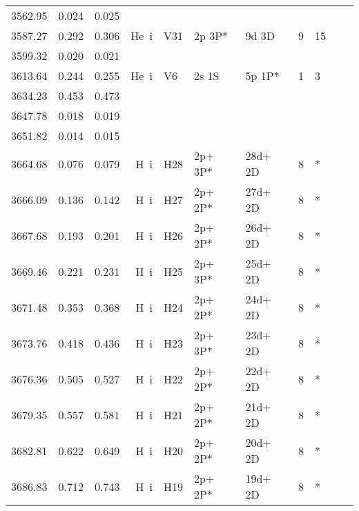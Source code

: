 \begin{longtable}{lrlrlllllll}
 3562.95 &   0.024 &   0.025                                                                                      \\
 3587.27 &   0.292 &   0.306 &  He~{\sc i}      &  V31       &  2p 3P*    &  9d 3D     &          9 &       15    \\
 3599.32 &   0.020 &   0.021                                                                                      \\
 3613.64 &   0.244 &   0.255 &  He~{\sc i}      &  V6        &  2s 1S     &  5p 1P*    &          1 &        3    \\
 3634.23 &   0.453 &   0.473                                                                                      \\
 3647.78 &   0.018 &   0.019                                                                                      \\
 3651.82 &   0.014 &   0.015                                                                                      \\
 3664.68 &   0.076 &   0.079 &  H~{\sc i}       &  H28       &  2p+ 3P*   &  28d+ 2D   &          8 &        *    \\
 3666.09 &   0.136 &   0.142 &  H~{\sc i}       &  H27       &  2p+ 2P*   &  27d+ 2D   &          8 &        *    \\
 3667.68 &   0.193 &   0.201 &  H~{\sc i}       &  H26       &  2p+ 2P*   &  26d+ 2D   &          8 &        *    \\
 3669.46 &   0.221 &   0.231 &  H~{\sc i}       &  H25       &  2p+ 3P*   &  25d+ 2D   &          8 &        *    \\
 3671.48 &   0.353 &   0.368 &  H~{\sc i}       &  H24       &  2p+ 2P*   &  24d+ 2D   &          8 &        *    \\
 3673.76 &   0.418 &   0.436 &  H~{\sc i}       &  H23       &  2p+ 3P*   &  23d+ 2D   &          8 &        *    \\
 3676.36 &   0.505 &   0.527 &  H~{\sc i}       &  H22       &  2p+ 2P*   &  22d+ 2D   &          8 &        *    \\
 3679.35 &   0.557 &   0.581 &  H~{\sc i}       &  H21       &  2p+ 2P*   &  21d+ 2D   &          8 &        *    \\
 3682.81 &   0.622 &   0.649 &  H~{\sc i}       &  H20       &  2p+ 2P*   &  20d+ 2D   &          8 &        *    \\
 3686.83 &   0.712 &   0.743 &  H~{\sc i}       &  H19       &  2p+ 2P*   &  19d+ 2D   &          8 &        *    \\

\end{longtable}
